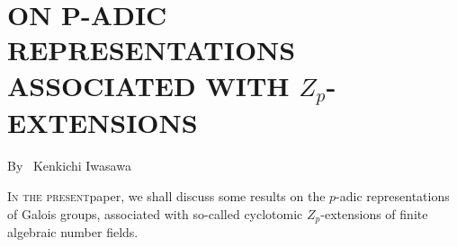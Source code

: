 \chapter{ON P-ADIC REPRESENTATIONS ASSOCIATED WITH $Z_{p}$-EXTENSIONS}\label{art-4}

\begin{center}
{\large By~ Kenkichi Iwasawa}
\end{center}


\bigskip

\setcounter{pageoriginal}{140}
\textsc{In the present}\pageoriginale paper, we shall discuss some results on the $p$-adic representations of Galois groups, associated with so-called cyclotomic $Z_{p}$-extensions of finite algebraic number fields.

